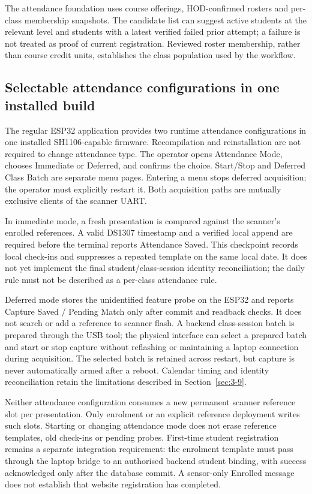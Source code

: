 The attendance foundation uses course offerings, HOD-confirmed rosters and per-class membership snapshots. The candidate list can suggest active students at the relevant level and students with a latest verified failed prior attempt; a failure is not treated as proof of current registration. Reviewed roster membership, rather than course credit units, establishes the class population used by the workflow.

\subsection{Selectable attendance configurations in one installed build}\label{sec:attendance-runtime-modes}

The regular ESP32 application provides two runtime attendance configurations in
one installed SH1106-capable firmware. Recompilation and reinstallation are not
required to change attendance type. The operator opens Attendance Mode, chooses
Immediate or Deferred, and confirms the choice. Start/Stop and Deferred Class
Batch are separate menu pages. Entering a menu stops deferred acquisition; the
operator must explicitly restart it. Both acquisition paths are mutually
exclusive clients of the scanner UART.\@



In immediate mode, a fresh presentation is compared against the scanner's
enrolled references. A valid DS1307 timestamp and a verified local append are
required before the terminal reports Attendance Saved. This checkpoint records
local check-ins and suppresses a repeated template on the same local date. It
does not yet implement the final student/class-session identity reconciliation;
the daily rule must not be described as a per-class attendance rule.

Deferred mode stores the unidentified feature probe on the ESP32 and reports
Capture Saved / Pending Match only after commit and readback checks. It does not
search or add a reference to scanner flash. A backend class-session batch is
prepared through the USB tool; the physical interface can select a prepared
batch and start or stop capture without reflashing or maintaining a laptop
connection during acquisition. The selected batch is retained across restart,
but capture is never automatically armed after a reboot. Calendar timing and
identity reconciliation retain the limitations described in Section~\ref{sec:3-9}.

Neither attendance configuration consumes a new permanent scanner reference
slot per presentation. Only enrolment or an explicit reference deployment writes
such slots. Starting or changing attendance mode does not erase reference
templates, old check-ins or pending probes. First-time student registration
remains a separate integration requirement: the enrolment template must pass
through the laptop bridge to an authorised backend student binding, with success
acknowledged only after the database commit. A sensor-only Enrolled message does
not establish that website registration has completed.

